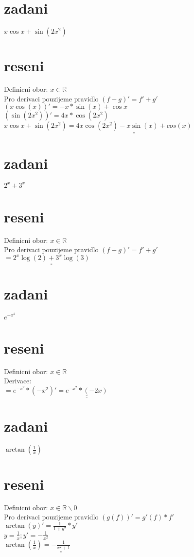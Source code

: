 \documentclass[a4paper]{article}
\def\doubleunderline#1{\underline{\underline{#1}}}
\begin{document}
\section*{zadani}
$x \cos x+ \sin(2x^2)$

\section*{reseni}
Definicni obor: $x \in \mathbb{R}$\\
Pro derivaci pouzijeme pravidlo $(f+g)' = f' + g'$\\
$(x \cos(x))' = -x * \sin(x) + \cos x$\\
$(\sin(2x^2))' = 4x * \cos(2x^2)$\\
$x \cos x+ \sin(2x^2) = \doubleunderline{4x \cos(2x^2) - x \sin(x) + cos(x)}$



\section*{zadani}
$2^x+3^x$

\section*{reseni}
Definicni obor: $x \in \mathbb{R}$\\
Pro derivaci pouzijeme pravidlo $(f+g)' = f' + g'$\\
$=\doubleunderline{2^x \log(2) + 3^x \log(3)}$





\section*{zadani}
$e^{-x^2}$

\section*{reseni}
Definicni obor: $x \in \mathbb{R}$\\
Derivace:\\
$=e^{-x^2} * (-x^2)' = \doubleunderline{e^{-x^2} * (-2x)} $\\






\section*{zadani}
$\arctan(\frac{1}{x})$

\section*{reseni}
Definicni obor: $x \in \mathbb{R}\backslash{0}$\\
Pro derivaci pouzijeme pravidlo $(g(f))' = g'(f) * f'$\\
$\arctan(y)' = \frac{1}{1+y^2} * y'$\\
$y = \frac{1}{x}; y' = -\frac{1}{x^2}$\\
$\arctan(\frac{1}{x}) = \doubleunderline{-\frac{1}{x^2+1}}$
\end{document}
